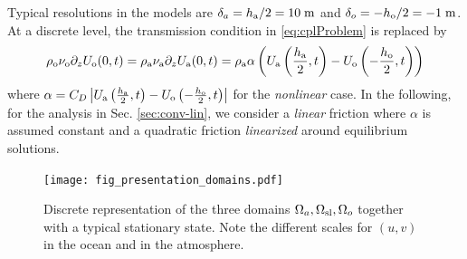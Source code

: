 %
Typical resolutions in the  models are 
$\delta_a=h_{\rm a}/2=10\;{\rm m}$ and $\delta_o=-h_{\rm o}/2=-1\;{\rm m}$.
At a discrete level, the transmission condition in \eqref{eq:cplProblem}
is replaced by
%
\begin{equation}\label{eq:discreteCouplingConditions}
    \rho_{\rm o} \nu_{\rm o} \partial_z U_{\rm o}(0,t)
    = \rho_{\rm a} \nu_{\rm a} \partial_z U_{\rm a}(0,t)
    = \rho_{\rm a} \alpha \left(
    U_{\rm a}\left( \frac{h_{\rm a}}{2},t \right) - U_{\rm o}\left(-\frac{h_{\rm o}}{2},t \right)
    \right)
\end{equation}
%
where 
$\alpha= C_D \left| U_{\rm a}\left( \frac{h_{\rm a}}{2},t \right) - U_{\rm o}\left(-\frac{h_{\rm o}}{2},t \right) \right|$ for the \textit{nonlinear} case.
In the following, for the analysis in Sec. \ref{sec:conv-lin}, we  consider 
a \textit{linear} friction where $\alpha$ is assumed constant and a 
quadratic friction \textit{linearized} around equilibrium solutions.
\begin{figure}
    \centering
    \texttt{[image: fig\_presentation\_domains.pdf]}
    \caption{Discrete representation of the three domains $\Omega_a, \Omega_{\rm sl}, \Omega_o$ together with a typical stationary state. Note the different scales for $(u,v)$ in the ocean and in the atmosphere.}
    \label{fig:presentationDomains}
\end{figure}

